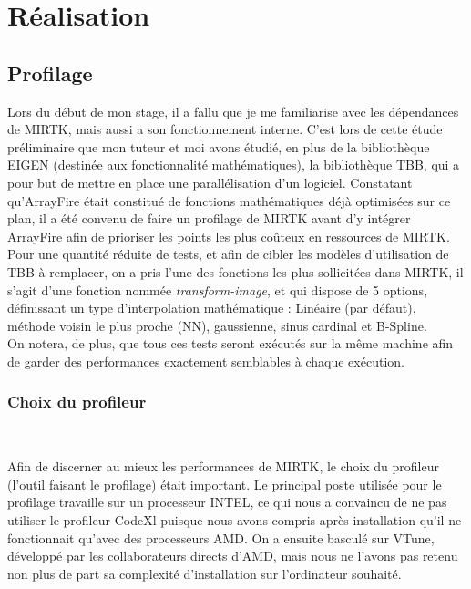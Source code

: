\documentclass[10pt]{report}
\begin{document}
\chapter{Réalisation}
	\section{Profilage}
	Lors du début de mon stage, il a fallu que je me familiarise avec les dépendances de MIRTK, mais aussi a son fonctionnement interne. C'est lors de cette étude préliminaire que mon tuteur et moi avons étudié, en plus de la bibliothèque EIGEN (destinée aux fonctionnalité mathématiques), la bibliothèque TBB, qui a pour but de mettre en place une parallélisation d'un logiciel. Constatant qu'ArrayFire était constitué de fonctions mathématiques déjà optimisées sur ce plan, il a été convenu de faire un profilage de MIRTK avant d'y intégrer ArrayFire afin de prioriser les points les plus coûteux en ressources de MIRTK. \\
	Pour une quantité réduite de tests, et afin de cibler les modèles d'utilisation de TBB à remplacer, on a pris l'une des fonctions les plus sollicitées dans MIRTK, il s'agit d'une fonction nommée \textit{transform-image}, et qui dispose de 5 options, définissant un type d'interpolation mathématique : Linéaire (par défaut), méthode voisin le plus proche (NN), gaussienne, sinus cardinal et B-Spline. \\
	On notera, de plus, que tous ces tests seront exécutés sur la même machine afin de garder des performances exactement semblables à chaque exécution.
	
	\subsection{Choix du profileur}~\par
	Afin de discerner au mieux les performances de MIRTK, le choix du profileur (l'outil faisant le profilage) était important. Le principal poste utilisée pour le profilage travaille sur un processeur INTEL, ce qui nous a convaincu de ne pas utiliser le profileur CodeXl puisque nous avons compris après installation qu'il ne fonctionnait qu'avec des processeurs AMD. On a ensuite basculé sur VTune, développé par les collaborateurs directs d'AMD, mais nous ne l'avons pas retenu non plus de part sa complexité d'installation sur l'ordinateur souhaité.
	
\end{document}
